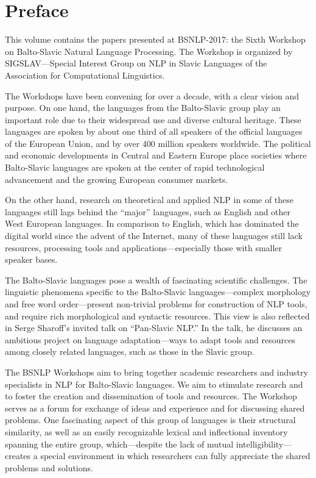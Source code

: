\section{Preface}

This volume contains the papers presented at BSNLP-2017: the Sixth
Workshop on Balto-Slavic Natural Language Processing.  The Workshop is
organized by SIGSLAV---Special Interest Group on NLP in Slavic Languages
of the Association for Computational Linguistics.

The Workshops have been convening for over a decade, with a clear vision
and purpose.  On one hand, the languages from the Balto-Slavic group play
an important role due to their widespread use and diverse cultural
heritage.  These languages are spoken by about one third of all speakers
of the official languages of the European Union, and by over 400 million
speakers worldwide.  The political and economic developments in Central
and Eastern Europe place societies where Balto-Slavic languages are
spoken at the center of rapid technological advancement and the growing
European consumer markets.

On the other hand, research on theoretical and applied NLP in some of
these languages still lags behind the ``major'' languages, such as
English and other West European languages.  In comparison to English,
which has dominated the digital world since the advent of the Internet,
many of these languages still lack resources, processing tools and
applications---especially those with smaller speaker bases.

The Balto-Slavic languages pose a wealth of fascinating scientific
challenges.  The linguistic phenomena specific to the Balto-Slavic
languages---complex morphology and free word order---present non-trivial
problems for construction of NLP tools, and require rich morphological
and syntactic resources.  This view is also reflected in Serge Sharoff's
invited talk on ``Pan-Slavic NLP.''  In the talk, he discusses an
ambitious project on language adaptation---ways to adapt tools and resources
among closely related languages, such as those in the Slavic group.

The BSNLP Workshops aim to bring together academic researchers and
industry specialists in NLP for Balto-Slavic languages.  We aim to
stimulate research and to foster the creation and dissemination of tools
and resources.  The Workshop serves as a forum for exchange of ideas and
experience and for discussing shared problems.  One fascinating aspect of
this group of languages is their structural similarity, as well as an
easily recognizable lexical and inflectional inventory spanning the
entire group, which---despite the lack of mutual
intelligibility---creates a special environment in which researchers can
fully appreciate the shared problems and solutions.

